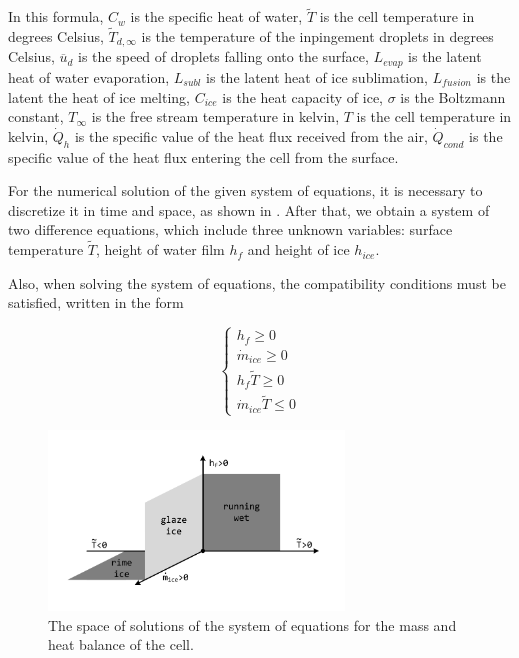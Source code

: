 \documentclass[
11pt,%
tightenlines,%
twoside,%
onecolumn,%
nofloats,%
nobibnotes,%
nofootinbib,%
superscriptaddress,%
noshowpacs,%
centertags]%
{revtex4}
\begin{document}
In this formula, $C_w$ is the specific heat of water, $\tilde{T}$ is the cell temperature in degrees Celsius, $\tilde{T}_{d,\infty}$ is the temperature of the inpingement droplets in degrees Celsius, $\overline{u}_d$ is the speed of droplets falling onto the surface, $L_{evap}$ is the latent heat of water evaporation, $L_{subl}$ is the latent heat of ice sublimation, $L_{fusion}$ is the latent the heat of ice melting, $C_{ice}$ is the heat capacity of ice, $\sigma$ is the Boltzmann constant, $T_{\infty}$ is the free stream temperature in kelvin, $T$ is the cell temperature in kelvin, $\dot Q_h$ is the specific value of the heat flux received from the air, $\dot Q_{cond}$ is the specific value of the heat flux entering the cell from the surface.

For the numerical solution of the given system of equations, it is necessary to discretize it in time and space, as shown in \cite{Beaugendre}.
After that, we obtain a system of two difference equations, which include three unknown variables: surface temperature $\tilde{T}$, height of water film $h_f$ and height of ice $h_{ice}$.

Also, when solving the system of equations, the compatibility conditions must be satisfied, written in the form

\begin{equation}
\begin{cases}
h_f \ge 0\\
\dot m_{ice} \ge 0\\
h_f \tilde{T} \ge 0\\
\dot m_{ice} \tilde{T} \le 0
\end{cases}
\end{equation}

\begin{figure}[h]
\setcaptionmargin{5mm}
\onelinecaptionstrue
\includegraphics[width=0.7\textwidth]{pics/surface.pdf}
\caption{The space of solutions of the system of equations for the mass and heat balance of the cell.}\label{fig:surface}
\end{figure}
\end{document}
